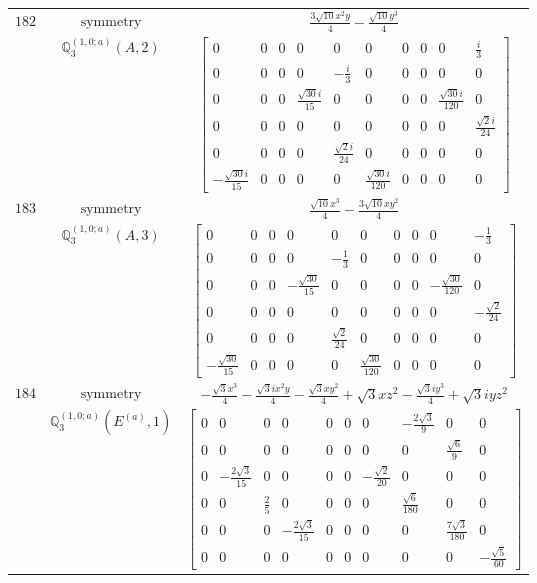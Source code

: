 \documentclass[fleqn,8pt,landscape]{jsarticle}
\begin{document}
\begin{longtable}{ccc}
$ 182 $ & $ \text{symmetry} $ & $ \frac{3 \sqrt{10} x^{2} y}{4} - \frac{\sqrt{10} y^{3}}{4} $ \\
$  $ & $ \mathbb{Q}_{3}^{(1,0;a)}(A,2) $ & $ \begin{bmatrix} 0 & 0 & 0 & 0 & 0 & 0 & 0 & 0 & 0 & \frac{i}{3} \\ 0 & 0 & 0 & 0 & - \frac{i}{3} & 0 & 0 & 0 & 0 & 0 \\ 0 & 0 & 0 & \frac{\sqrt{30} i}{15} & 0 & 0 & 0 & 0 & \frac{\sqrt{30} i}{120} & 0 \\ 0 & 0 & 0 & 0 & 0 & 0 & 0 & 0 & 0 & \frac{\sqrt{2} i}{24} \\ 0 & 0 & 0 & 0 & \frac{\sqrt{2} i}{24} & 0 & 0 & 0 & 0 & 0 \\ - \frac{\sqrt{30} i}{15} & 0 & 0 & 0 & 0 & \frac{\sqrt{30} i}{120} & 0 & 0 & 0 & 0 \end{bmatrix} $ \\ \hline
$ 183 $ & $ \text{symmetry} $ & $ \frac{\sqrt{10} x^{3}}{4} - \frac{3 \sqrt{10} x y^{2}}{4} $ \\
$  $ & $ \mathbb{Q}_{3}^{(1,0;a)}(A,3) $ & $ \begin{bmatrix} 0 & 0 & 0 & 0 & 0 & 0 & 0 & 0 & 0 & - \frac{1}{3} \\ 0 & 0 & 0 & 0 & - \frac{1}{3} & 0 & 0 & 0 & 0 & 0 \\ 0 & 0 & 0 & - \frac{\sqrt{30}}{15} & 0 & 0 & 0 & 0 & - \frac{\sqrt{30}}{120} & 0 \\ 0 & 0 & 0 & 0 & 0 & 0 & 0 & 0 & 0 & - \frac{\sqrt{2}}{24} \\ 0 & 0 & 0 & 0 & \frac{\sqrt{2}}{24} & 0 & 0 & 0 & 0 & 0 \\ - \frac{\sqrt{30}}{15} & 0 & 0 & 0 & 0 & \frac{\sqrt{30}}{120} & 0 & 0 & 0 & 0 \end{bmatrix} $ \\ \hline
$ 184 $ & $ \text{symmetry} $ & $ - \frac{\sqrt{3} x^{3}}{4} - \frac{\sqrt{3} i x^{2} y}{4} - \frac{\sqrt{3} x y^{2}}{4} + \sqrt{3} x z^{2} - \frac{\sqrt{3} i y^{3}}{4} + \sqrt{3} i y z^{2} $ \\
$  $ & $ \mathbb{Q}_{3}^{(1,0;a)}(E^{(a)},1) $ & $ \begin{bmatrix} 0 & 0 & 0 & 0 & 0 & 0 & 0 & - \frac{2 \sqrt{3}}{9} & 0 & 0 \\ 0 & 0 & 0 & 0 & 0 & 0 & 0 & 0 & \frac{\sqrt{6}}{9} & 0 \\ 0 & - \frac{2 \sqrt{3}}{15} & 0 & 0 & 0 & 0 & - \frac{\sqrt{2}}{20} & 0 & 0 & 0 \\ 0 & 0 & \frac{2}{5} & 0 & 0 & 0 & 0 & \frac{\sqrt{6}}{180} & 0 & 0 \\ 0 & 0 & 0 & - \frac{2 \sqrt{3}}{15} & 0 & 0 & 0 & 0 & \frac{7 \sqrt{3}}{180} & 0 \\ 0 & 0 & 0 & 0 & 0 & 0 & 0 & 0 & 0 & - \frac{\sqrt{5}}{60} \end{bmatrix} $ \\ \hline

\end{longtable}
\end{document}
